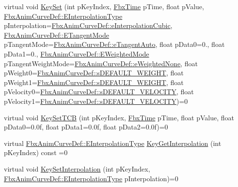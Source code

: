 \begin{DoxyCompactItemize}
\item 
virtual void \hyperlink{class_fbx_anim_curve_a70bb71da0c56a32be961384c015bb812}{Key\+Set} (int p\+Key\+Index, \hyperlink{class_fbx_time}{Fbx\+Time} p\+Time, float p\+Value, \hyperlink{class_fbx_anim_curve_def_add2ab7d10d856ab0868cc9b143d59ea5}{Fbx\+Anim\+Curve\+Def\+::\+E\+Interpolation\+Type} p\+Interpolation=\hyperlink{class_fbx_anim_curve_def_add2ab7d10d856ab0868cc9b143d59ea5a16ef50fcdbb8ae99246f06e12f9d3dae}{Fbx\+Anim\+Curve\+Def\+::e\+Interpolation\+Cubic}, \hyperlink{class_fbx_anim_curve_def_ac810ccc5ca0527704ab5175479964b87}{Fbx\+Anim\+Curve\+Def\+::\+E\+Tangent\+Mode} p\+Tangent\+Mode=\hyperlink{class_fbx_anim_curve_def_ac810ccc5ca0527704ab5175479964b87a56e3bad364851277281e94e81327dd25}{Fbx\+Anim\+Curve\+Def\+::e\+Tangent\+Auto}, float p\+Data0=0., float p\+Data1=0., \hyperlink{class_fbx_anim_curve_def_aeee6e9cc12501e10dbd3e5caaf66990e}{Fbx\+Anim\+Curve\+Def\+::\+E\+Weighted\+Mode} p\+Tangent\+Weight\+Mode=\hyperlink{class_fbx_anim_curve_def_aeee6e9cc12501e10dbd3e5caaf66990ea2ae55a3ceae7773d899ebfae26dcbef3}{Fbx\+Anim\+Curve\+Def\+::e\+Weighted\+None}, float p\+Weight0=\hyperlink{class_fbx_anim_curve_def_a6fd6b3907962eba0b1e71f28b55fad9d}{Fbx\+Anim\+Curve\+Def\+::s\+D\+E\+F\+A\+U\+L\+T\+\_\+\+W\+E\+I\+G\+HT}, float p\+Weight1=\hyperlink{class_fbx_anim_curve_def_a6fd6b3907962eba0b1e71f28b55fad9d}{Fbx\+Anim\+Curve\+Def\+::s\+D\+E\+F\+A\+U\+L\+T\+\_\+\+W\+E\+I\+G\+HT}, float p\+Velocity0=\hyperlink{class_fbx_anim_curve_def_abebd0a6078f18802836059fdefb36862}{Fbx\+Anim\+Curve\+Def\+::s\+D\+E\+F\+A\+U\+L\+T\+\_\+\+V\+E\+L\+O\+C\+I\+TY}, float p\+Velocity1=\hyperlink{class_fbx_anim_curve_def_abebd0a6078f18802836059fdefb36862}{Fbx\+Anim\+Curve\+Def\+::s\+D\+E\+F\+A\+U\+L\+T\+\_\+\+V\+E\+L\+O\+C\+I\+TY})=0
\item 
virtual void \hyperlink{class_fbx_anim_curve_af5319507799c6eea17c6550465065f8f}{Key\+Set\+T\+CB} (int p\+Key\+Index, \hyperlink{class_fbx_time}{Fbx\+Time} p\+Time, float p\+Value, float p\+Data0=0.\+0f, float p\+Data1=0.\+0f, float p\+Data2=0.\+0f)=0
\item 
virtual \hyperlink{class_fbx_anim_curve_def_add2ab7d10d856ab0868cc9b143d59ea5}{Fbx\+Anim\+Curve\+Def\+::\+E\+Interpolation\+Type} \hyperlink{class_fbx_anim_curve_a14158288d26a4fc08c6ae7b2ff8d6638}{Key\+Get\+Interpolation} (int p\+Key\+Index) const =0
\item 
virtual void \hyperlink{class_fbx_anim_curve_aa9de6c77c7d81def717ff34f01a660fb}{Key\+Set\+Interpolation} (int p\+Key\+Index, \hyperlink{class_fbx_anim_curve_def_add2ab7d10d856ab0868cc9b143d59ea5}{Fbx\+Anim\+Curve\+Def\+::\+E\+Interpolation\+Type} p\+Interpolation)=0

\end{DoxyCompactItemize}
